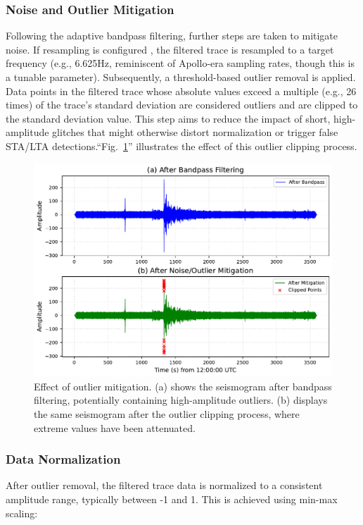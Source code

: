 \documentclass[conference]{IEEEtran}
\begin{document}
        \subsubsection{Noise and Outlier Mitigation}
            Following the adaptive bandpass filtering, further steps are taken to mitigate noise. If resampling is
            configured , the filtered trace is resampled to a target frequency (e.g., 6.625Hz, reminiscent of Apollo-era
            sampling rates, though this is a tunable parameter). Subsequently, a threshold-based outlier removal is applied.
            Data points in the filtered trace whose absolute values exceed a multiple (e.g., 26 times) of the trace's
            standard deviation are considered outliers and are clipped to the standard deviation value. This step aims to
            reduce the impact of short, high-amplitude glitches that might otherwise distort normalization or trigger false
            STA/LTA detections.``Fig.~\ref{fig:outlier_clipping_comparison}'' illustrates the effect of this outlier clipping process.

        \begin{figure}[htbp]
            \centerline{\includegraphics[width=0.9\columnwidth]{figures/fig3_mitigation.pdf}}
            \caption{Effect of outlier mitigation. (a) shows the seismogram after bandpass filtering, 
            potentially containing high-amplitude outliers. (b) displays the same seismogram after 
            the outlier clipping process, where extreme values have been attenuated.}
            \label{fig:outlier_clipping_comparison}
        \end{figure}

        \subsubsection{Data Normalization}
            After outlier removal, the filtered trace data is normalized to a consistent amplitude range,
            typically between -1 and 1. This is achieved using min-max scaling:
            
\end{document}
